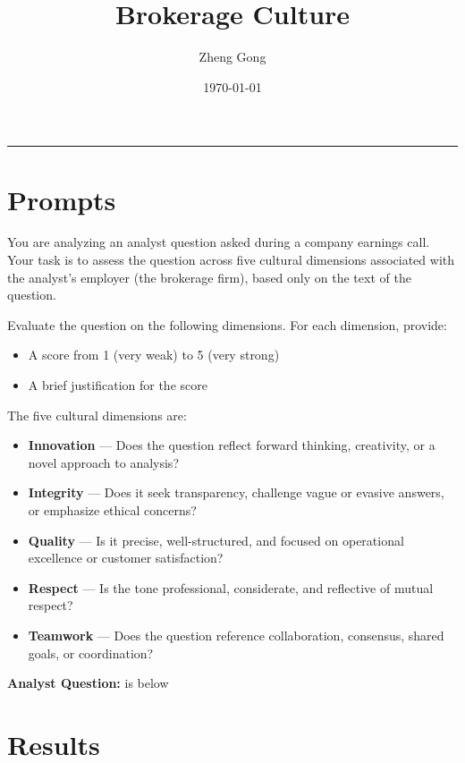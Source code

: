 \documentclass[10pt]{article}
\title{Brokerage Culture}
\author{Zheng Gong}
\date{\today}
\begin{document}
\maketitle
\thispagestyle{empty}
\begin{center}
    \rule{0.8\textwidth}{0.4pt}
\end{center}
\vspace{1em}


\section{Prompts}

You are analyzing an analyst question asked during a company earnings call. Your task is to assess the question across five cultural dimensions associated with the analyst’s employer (the brokerage firm), based only on the text of the question.

Evaluate the question on the following dimensions. For each dimension, provide:
\begin{itemize}
\item A score from 1 (very weak) to 5 (very strong)
\item A brief justification for the score
\end{itemize}

The five cultural dimensions are:

\begin{itemize}
\item \textbf{Innovation} — Does the question reflect forward thinking, creativity, or a novel approach to analysis?
\item \textbf{Integrity} — Does it seek transparency, challenge vague or evasive answers, or emphasize ethical concerns?
\item \textbf{Quality} — Is it precise, well-structured, and focused on operational excellence or customer satisfaction?
\item \textbf{Respect} — Is the tone professional, considerate, and reflective of mutual respect?
\item \textbf{Teamwork} — Does the question reference collaboration, consensus, shared goals, or coordination?
\end{itemize}

\textbf{Analyst Question:} is below


\section{Results}

    



\end{document}
